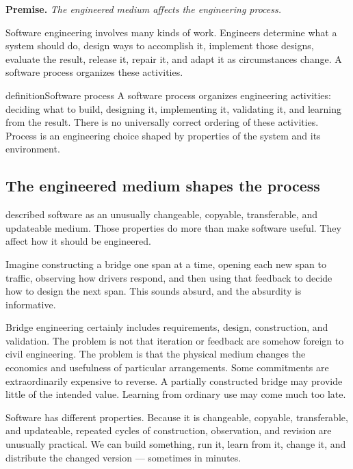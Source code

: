 \textbf{Premise.} \emph{The engineered medium affects the engineering process.}

Software engineering involves many kinds of work. Engineers determine what a system should do, design
ways to accomplish it, implement those designs, evaluate the result, release it, repair it, and adapt it
as circumstances change. A software process organizes these activities.

\begin{bookbox}{definition}{Software process} %
A software process organizes engineering activities: deciding what to build, designing it, implementing
it, validating it, and learning from the result. There is no universally correct ordering of these
activities. Process is an engineering choice shaped by properties of the system and its environment.
\end{bookbox}

\subsection{The engineered medium shapes the process}\label{sec-medium-shapes-process}

\citet{ch-software-engineering} described software as an unusually changeable, copyable, transferable, and
updateable medium. Those properties do more than make software useful. They affect how it should be
engineered.

Imagine constructing a bridge one span at a time, opening each new span to traffic, observing how
drivers respond, and then using that feedback to decide how to design the next span. This sounds
absurd, and the absurdity is informative.

Bridge engineering certainly includes requirements, design, construction, and validation. The problem is
not that iteration or feedback are somehow foreign to civil engineering. The problem is that the physical
medium changes the economics and usefulness of particular arrangements. Some commitments are
extraordinarily expensive to reverse. A partially constructed bridge may provide little of the intended
value. Learning from ordinary use may come much too late.

Software has different properties. Because it is changeable, copyable, transferable, and updateable,
repeated cycles of construction, observation, and revision are unusually practical. We can build
something, run it, learn from it, change it, and distribute the changed version --- sometimes in minutes.

